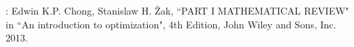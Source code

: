 \documentclass[12pt,thmsa]{article}
\begin{document}

\bigskip

\noindent
[Ref]: Edwin K.P. Chong, Stanislaw H. Żak, ``PART I MATHEMATICAL REVIEW" in ``An introduction to optimization", 4th Edition, John Wiley and Sons, Inc. 2013.
\end{document}
